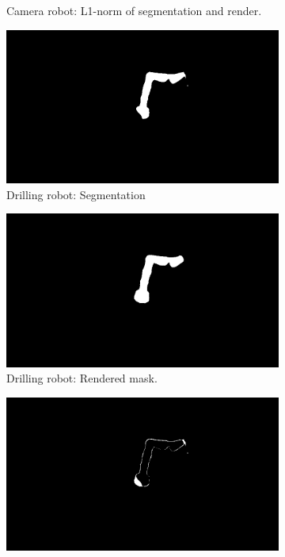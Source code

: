 \begin{figure}[tb]
\begin{subfigure}[b]{0.32\textwidth}
        \caption{Camera robot: L1-norm of segmentation and render.}
    \end{subfigure}
    \begin{subfigure}[b]{0.32\textwidth}
        \includegraphics[width=\textwidth]{chapter_1/img/drill_left_mask_1.png}
        \caption{Drilling robot: Segmentation}
    \end{subfigure}
    \begin{subfigure}[b]{0.32\textwidth}
        \includegraphics[width=\textwidth]{chapter_1/img/drill_left_render_mask_1.png}
        \caption{Drilling robot: Rendered mask.}
    \end{subfigure}
    \begin{subfigure}[b]{0.32\textwidth}
        \includegraphics[width=\textwidth]{chapter_1/img/drill_left_difference_1.png}

\end{subfigure}
\end{figure}
